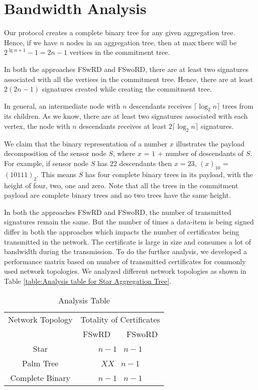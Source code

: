 	\section{Bandwidth Analysis}

		Our protocol creates a complete binary tree for any given aggregation tree.
		Hence, if we have $n$ nodes in an aggregation tree, then at max there will be $2^{\lg n + 1} - 1 = 2n-1$ vertices in the commitment tree.

		In both the approaches FSwRD and FSwoRD, there are at least two signatures associated with all the vertices in the commitment tree.
		Hence, there are at least $2(2n-1)$ signatures created while creating the commitment tree.

		In general, an intermediate node with $n$ descendants receives $\lceil \log_2 n \rceil$ trees from its children.
		As we know, there are at least two signatures associated with each vertex, the node with $n$ descendants receives at least $2 \lceil \log_2 n \rceil $ signatures.

		We claim that the binary representation of a number $x$ illustrates the payload decomposition of the sensor node $S$, where $x$ = $1$ + number of descendants of $S$.
		For example, if sensor node $S$ has $22$ descendants then $x =23$, $(x)_{10}$ = $(10111)_{2}$. 
		This means $S$ has four complete binary trees in its payload, with the height of four, two, one and zero.
		Note that all the trees in the commitment payload are complete binary trees and no two trees have the same height.
		
		In both the approaches FSwRD and FSwoRD, the number of transmitted signatures remain the same. 
		But the number of times a data-item is being signed differ in both the approaches which impacts the number of certificates being transmitted in the network.
		The certificate is large in size and consumes a lot of bandwidth during the transmission.
		To do the further analysis, we developed a performance matrix based on number of transmitted certificates for commonly used network topologies.
		We analyzed different network topologies as shown in Table \ref{table:Analysis table for Star Aggregation Tree}. 
		\begin{table}[!htb]
			\begin{center}
				\caption{Analysis Table}
				\begin{tabular}{|c|c|}
					\hline
					Network Topology & Totality of Certificates \\ 
					\cline{2-2}
					 & FSwRD \mbox{   } \vline \mbox{   } FSwoRD \\
					\hline
					Star & $n - 1$ \vline \mbox{   }$n -1$ \\
					\hline
					Palm Tree & $XX$ \vline \mbox{   }$n - 1$\\
					\hline
					Complete Binary & $n - 1$ \vline \mbox{   }$n - 1$\\
					\hline
				\end{tabular}
			\end{center}
		\end{table}

